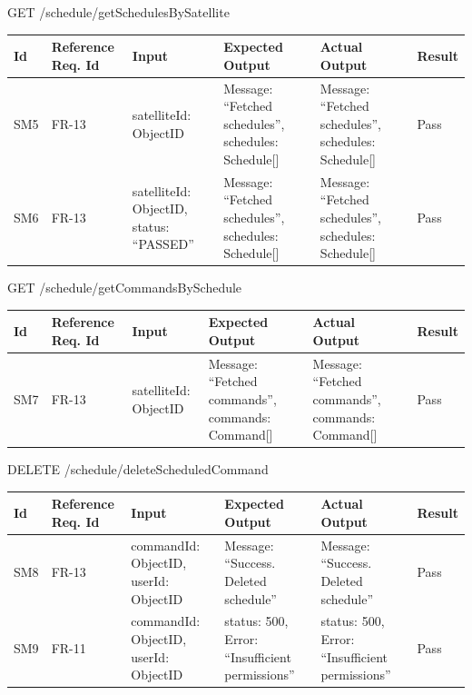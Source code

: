 \documentclass[12pt, titlepage]{article}
\begin{document}
GET /schedule/getSchedulesBySatellite

\begin{center}
\begin{tabular}{|p{1cm} | p{2cm} |p{2cm}| p{2cm} |p{2cm}| p{2cm}|}
\hline
\textbf{Id} & \textbf{Reference Req. Id} & \textbf{Input} & \textbf{Expected Output} & \textbf{Actual Output} & \textbf{Result} \\
\hline
SM5 & FR-13 & { satelliteId: ObjectID } & { Message: “Fetched schedules”,
schedules: Schedule[] } & { Message: “Fetched schedules”,
schedules: Schedule[] } & Pass
\\
\hline
SM6 & FR-13 & { satelliteId: ObjectID,
status: “PASSED” } & { Message: “Fetched schedules”,
schedules: Schedule[] } & { Message: “Fetched schedules”,
schedules: Schedule[] } & Pass
\\
\hline

\end{tabular}

\end{center}

GET /schedule/getCommandsBySchedule


\begin{center}
\begin{tabular}{|p{1cm} | p{2cm} |p{2cm}| p{2cm} |p{2cm}| p{2cm}|}
\hline
\textbf{Id} & \textbf{Reference Req. Id} & \textbf{Input} & \textbf{Expected Output} & \textbf{Actual Output} & \textbf{Result} \\
\hline
SM7 & FR-13 & { satelliteId: ObjectID } & { Message: “Fetched commands”,
commands: Command[] } & { Message: “Fetched commands”,
commands: Command[] } & Pass
\\
\hline

\end{tabular}

\end{center}

DELETE /schedule/deleteScheduledCommand

\begin{center}
\begin{tabular}{|p{1cm} | p{2cm} |p{2cm}| p{2cm} |p{2cm}| p{2cm}|}
\hline
\textbf{Id} & \textbf{Reference Req. Id} & \textbf{Input} & \textbf{Expected Output} & \textbf{Actual Output} & \textbf{Result} \\
\hline
SM8 & FR-13 & { commandId: ObjectID,
userId: ObjectID } & { Message: “Success. Deleted schedule” } & { Message: “Success. Deleted schedule” } & Pass
\\
\hline
SM9 & FR-11 & { commandId: ObjectID,
userId: ObjectID } & { status: 500,
Error: “Insufficient permissions” } & { status: 500,
Error: “Insufficient permissions” } & Pass
\\
\hline

\end{tabular}

\end{center}
\end{document}

